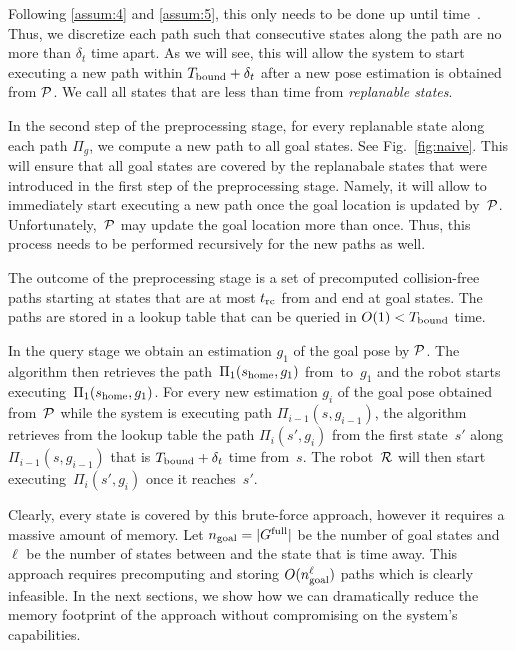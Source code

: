 \documentclass[conference]{IEEEtran}
\begin{document}
%
Following \ref{assum:4} and \ref{assum:5}, this only needs to be done up until time~\Trc.
Thus, we discretize each path such that consecutive states along the path are no more than $\delta _t$ time apart. As we will see, this will allow the system to start executing a new path within $T_{\textrm{bound}} + \delta_t$ after a new pose estimation is obtained from $\mathcal{P}$.
%
We call all states that are less than \Trc time from \Shome \emph{replanable states}.


In the second step of the preprocessing stage, for every replanable state along each path $\Pi_g$, we compute a new path to all goal states. 
See Fig.~\ref{fig:naive}.
%
This will ensure that all goal states are covered by the replanabale states that were introduced in the first step of the preprocessing stage. Namely, it will allow to immediately start executing a new path once the goal location is updated by~$\mathcal{P}$.
%
Unfortunately,~$\mathcal{P}$ may update the goal location more than once. Thus, this process needs to be performed recursively for the new paths as well.


The outcome of the preprocessing stage is a set of precomputed collision-free paths starting at states that are at most $t_{\textrm{rc}}$ from \Shome and end at goal states.
The paths are stored in a lookup table that can be queried in $O(1) < T_{\textrm{bound}}$ time.

In the query stage we obtain an estimation $g_1$ of the goal pose by $\mathcal{P}$. 
The algorithm then retrieves the path~$\Pi_1(s_{\textrm{home}},g_1)$ from~\Shome to~$g_1$ and the robot starts executing~$\Pi_1(s_{\textrm{home}},g_1)$.
%
For every new estimation $g_i$ of the goal pose obtained from~$\mathcal{P}$  while the system is executing path $\Pi_{i-1}(s,g_{i-1})$, the algorithm retrieves from the lookup table the path $\Pi_i(s',g_i)$ from the first state~$s'$ along $\Pi_{i-1}(s,g_{i-1})$ that is $T_{\textrm{bound}} + \delta_t$ time from~$s$. The robot~$\mathcal{R}$ will then start executing~$\Pi_i(s',g_i)$ once it reaches~$s'$.

Clearly, every state is covered by this brute-force approach, however it requires a massive amount of memory.
Let $n_{\rm goal} = \vert G^{\textrm{full}} \vert$ be the number of goal states and
$\ell$ be the number of states between \Shome and the state that is \Trc time away.
This approach requires precomputing and storing $O(n_{\rm goal}^\ell)$ paths which is clearly infeasible.
In the next sections, we show how we can dramatically reduce the memory footprint of the approach without compromising on the system's capabilities.
\end{document}
